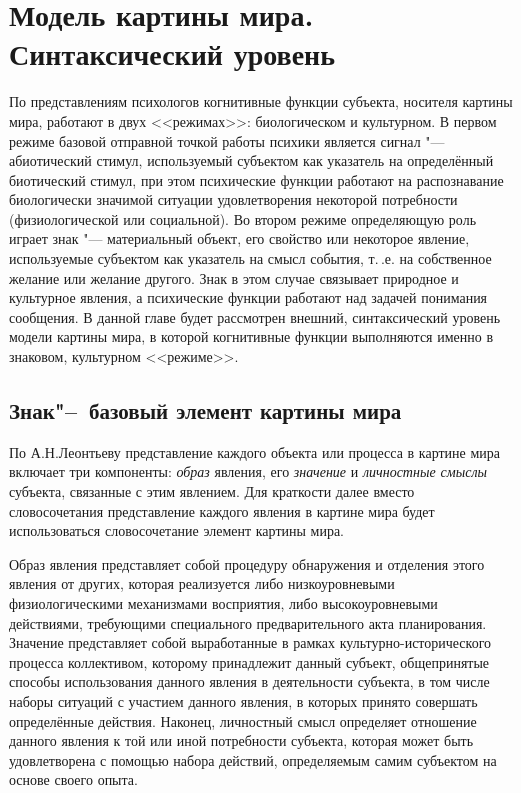 \chapter{Модель картины мира. Синтаксический уровень} \label{chapt2}

По представлениям психологов \cite{Chudova2012} когнитивные функции субъекта, носителя картины мира, работают в двух <<режимах>>: биологическом и культурном. В первом режиме базовой отправной точкой работы психики является сигнал "--- абиотический стимул, используемый субъектом как указатель на определённый биотический стимул, при этом психические функции работают на распознавание биологически значимой ситуации удовлетворения некоторой потребности (физиологической или социальной). Во втором режиме определяющую роль играет знак "--- материальный объект, его свойство или некоторое явление, используемые субъектом как указатель на смысл события, т.\,.е. на собственное желание или желание другого. Знак в этом случае связывает природное и культурное явления, а психические функции работают над задачей понимания сообщения. В данной главе будет рассмотрен внешний, синтаксический уровень модели картины мира, в которой когнитивные функции выполняются именно в знаковом, культурном <<режиме>>.

\section{Знак"--~базовый элемент картины мира} \label{sect2_1}

По А.Н.Леонтьеву \cite{Leontiev1975} представление каждого объекта или процесса в картине мира включает три компоненты: \textit{образ} явления, его \textit{значение} и \textit{личностные смыслы} субъекта, связанные с этим явлением. Для краткости далее вместо словосочетания представление каждого явления в картине мира будет использоваться словосочетание элемент картины мира.

Образ явления представляет собой процедуру обнаружения и отделения этого явления от других, которая реализуется либо низкоуровневыми физиологическими механизмами восприятия, либо высокоуровневыми действиями, требующими специального предварительного акта планирования. Значение представляет собой выработанные в рамках культурно-исторического процесса коллективом, которому принадлежит данный субъект, общепринятые способы использования данного явления в деятельности субъекта, в том числе наборы ситуаций с участием данного явления, в которых принято совершать определённые действия. Наконец, личностный смысл определяет отношение данного явления к той или иной потребности субъекта, которая может быть удовлетворена с помощью набора действий, определяемым самим субъектом на основе своего опыта.


